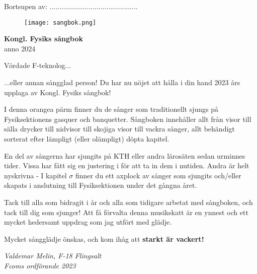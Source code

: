 \documentclass[a6paper,12pt]{article}
\begin{document}
\noindent Bortsupen av: .............................................
\vspace{50pt}
\begin{figure}[!h]
\centering
\texttt{[image: sangbok.png]}
\end{figure}
\vspace{-20pt}
\begin{center}
\Huge\textbf{Kongl. Fysiks sångbok} \\
\Large anno 2024
\end{center}

\newpage
\setlength{\oddsidemargin}{-0.57in}
\noindent
\Large Vördade F-teknolog... 

\footnotesize \noindent ...eller annan sångglad person!  Du har nu nöjet att hålla i din hand 2023 års upplaga av Kongl. Fysiks sångbok!

I denna orangea pärm finner du de sånger som traditionellt sjungs på Fysiksektionens gasquer och banquetter.
Sångboken innehåller allt från visor till sälla drycker till nidvisor
till skojiga visor till vackra sånger, allt behändigt
sorterat efter lämpligt (eller olämpligt) döpta kapitel.

En del av sångerna har sjungits på KTH eller andra lärosäten sedan urminnes tider.
Vissa har fått sig en justering i för att ta in dem i nutiden.
Andra är helt nyskrivna - I kapitel $\sigma$ finner du ett axplock av sånger som sjungits
och/eller skapats i anslutning till Fysiksektionen under det gångna året. 

Tack till alla som bidragit i år och alla som tidigare arbetat med sångboken, och tack till dig som sjunger! Att få förvalta denna musikskatt är en
ynnest och ett mycket hedersamt uppdrag som jag utfört med glädje.

Mycket sångglädje önskas, och kom ihåg att \textbf{starkt
är vackert!}

\begin{flushright}
\textit{Valdemar Melin, F-18 Flingsalt\\ Fcoms ordförande 2023}
\end{flushright}

\newpage

\end{document}
